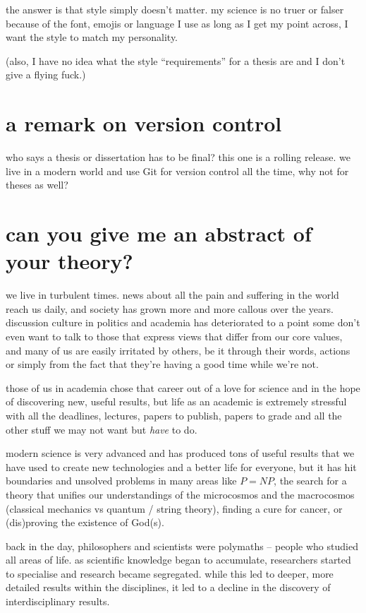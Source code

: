 \documentclass[12pt]{report}
\theoremstyle{definition}
\theoremstyle{remark}
\begin{document}
the answer is that style simply doesn't matter. my science is no truer or falser because of the font, emojis or language I use as long as I get my point across, I want the style to match my personality.

(also, I have no idea what the style ``requirements'' for a thesis are and I don't give a flying fuck.)

\section{a remark on version control}

who says a thesis or dissertation has to be final? this one is a rolling release. we live in a modern world and use Git for version control all the time, why not for theses as well?

\section{can you give me an abstract of your theory?}

we live in turbulent times. news about all the pain and suffering in the world reach us daily, and society has grown more and more callous over the years. discussion culture in politics and academia has deteriorated to a point some don't even want to talk to those that express views that differ from our core values, and many of us are easily irritated by others, be it through their words, actions or simply from the fact that they're having a good time while we're not.

those of us in academia chose that career out of a love for science and in the hope of discovering new, useful results, but life as an academic is extremely stressful with all the deadlines, lectures, papers to publish, papers to grade and all the other stuff we may not want but \emph{have} to do.

modern science is very advanced and has produced tons of useful results that we have used to create new technologies and a better life for everyone, but it has hit boundaries and unsolved problems in many areas like $P=NP$, the search for a theory that unifies our understandings of the microcosmos and the macrocosmos (classical mechanics vs quantum / string theory), finding a cure for cancer, or (dis)proving the existence of God(s).

back in the day, philosophers and scientists were polymaths -- people who studied all areas of life. as scientific knowledge began to accumulate, researchers started to specialise and research became segregated. while this led to deeper, more detailed results within the disciplines, it led to a decline in the discovery of interdisciplinary results.
\end{document}
